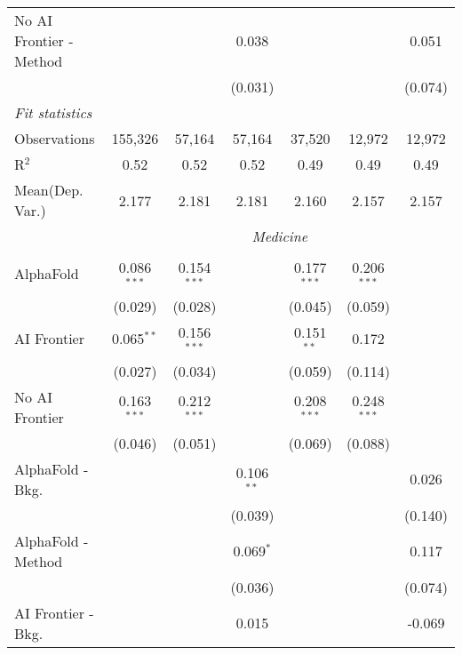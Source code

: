 \begin{tabular}{lcccccc}
   No AI Frontier - Method &               &               & 0.038         &               &               & 0.051\\   
                           &               &               & (0.031)       &               &               & (0.074)\\   
   \midrule
   \emph{Fit statistics}\\
   Observations            & 155,326       & 57,164        & 57,164        & 37,520        & 12,972        & 12,972\\  
   R$^2$                   & 0.52          & 0.52          & 0.52          & 0.49          & 0.49          & 0.49\\  
   
Mean(Dep. Var.) & 2.177 & 2.181 & 2.181 & 2.160 & 2.157 & 2.157 \\
 & \multicolumn{6}{c}{\textit{Medicine}} \\ \\
   AlphaFold               & 0.086$^{***}$ & 0.154$^{***}$ &               & 0.177$^{***}$ & 0.206$^{***}$ &   \\   
                           & (0.029)       & (0.028)       &               & (0.045)       & (0.059)       &   \\   
   AI Frontier             & 0.065$^{**}$  & 0.156$^{***}$ &               & 0.151$^{**}$  & 0.172         &   \\   
                           & (0.027)       & (0.034)       &               & (0.059)       & (0.114)       &   \\   
   No AI Frontier          & 0.163$^{***}$ & 0.212$^{***}$ &               & 0.208$^{***}$ & 0.248$^{***}$ &   \\   
                           & (0.046)       & (0.051)       &               & (0.069)       & (0.088)       &   \\   
   AlphaFold - Bkg.        &               &               & 0.106$^{**}$  &               &               & 0.026\\   
                           &               &               & (0.039)       &               &               & (0.140)\\   
   AlphaFold - Method      &               &               & 0.069$^{*}$   &               &               & 0.117\\   
                           &               &               & (0.036)       &               &               & (0.074)\\   
   AI Frontier - Bkg.      &               &               & 0.015         &               &               & -0.069\\   

\end{tabular}
